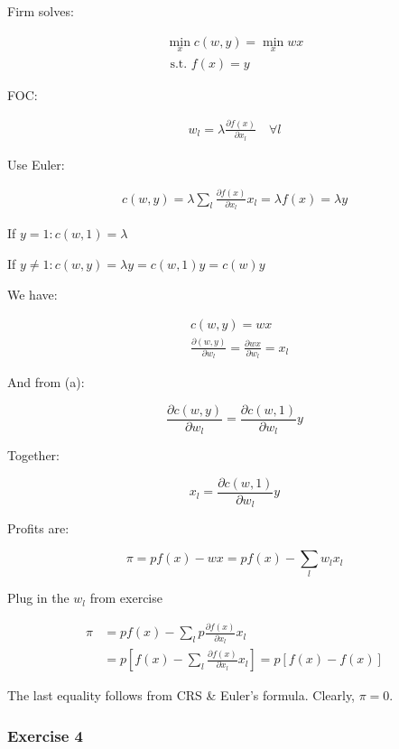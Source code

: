 {{\begin{enumerate}[label=(\alph*)]
{\item 
Firm solves:

\begin{align*}
    \min _{x} c(w, y) = \min_x w x \\
    \text { s.t. } f(x)=y
\end{align*}

FOC:

\begin{align*}
    w_{l}=\lambda \frac{\partial f(x)}{\partial x_{l}} \quad \forall l
\end{align*}

Use Euler:

\begin{align*}
    c(w, y)=\lambda \sum_{l} \frac{\partial f(x)}{\partial x_{l}} x_{l}=\lambda f(x)=\lambda y
\end{align*}

If $y=1: c(w, 1)=\lambda$

If $y \neq 1: c(w, y)=\lambda y=c(w, 1) y=c(w) y$
}
{\item 
We have:

$$
\begin{aligned}
& c(w, y)=w x \\
& \frac{\partial(w, y)}{\partial w_{l}}=\frac{\partial w x}{\partial w_{l}}=x_{l}
\end{aligned}
$$

And from (a):

$$
\frac{\partial c(w, y)}{\partial w_{l}}=\frac{\partial c(w, 1)}{\partial w_{l}} y
$$

Together:

$$
x_{l}=\frac{\partial c\left(w, 1\right)}{\partial w_{l}} y
$$
}
{\item 
Profits are:

$$
\pi=p f(x)-w x=p f(x)-\sum_{l} w_{l} x_{l}
$$

Plug in the $w_l$ from exercise

$$
\begin{aligned}
\pi & =p f(x)-\sum_{l} p \frac{\partial f(x)}{\partial x_{l}} x_{l} \\
& =p\left[f(x)-\sum_{l} \frac{\partial f(x)}{\partial x_{l}} x_{l}\right]=p[f(x)-f(x)]
\end{aligned}
$$

The last equality follows from CRS \& Euler's formula. Clearly, $\pi=0$.
}
\end{enumerate}
}
{
\subsubsection*{Exercise 4}

}}
